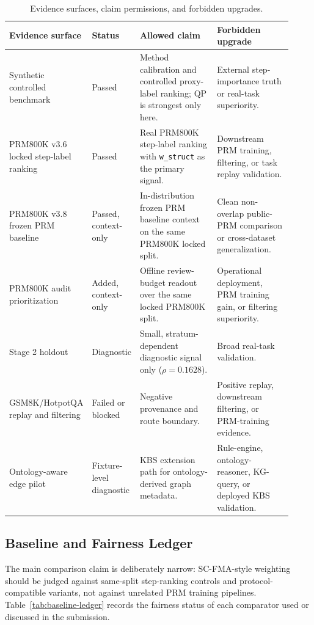 \documentclass[a4paper,fleqn]{cas-sc}
\begin{document}
\begin{table}[t]
\caption{Evidence surfaces, claim permissions, and forbidden upgrades.}
\label{tab:data-boundary}
\centering
\scriptsize
\begin{tabular}{p{0.20\linewidth}p{0.16\linewidth}p{0.29\linewidth}p{0.27\linewidth}}
\toprule
\textbf{Evidence surface} & \textbf{Status} & \textbf{Allowed claim} & \textbf{Forbidden upgrade} \\
\midrule
Synthetic controlled benchmark & Passed & Method calibration and controlled proxy-label ranking; QP is strongest only here. & External step-importance truth or real-task superiority. \\
PRM800K v3.6 locked step-label ranking & Passed & Real PRM800K step-label ranking with \texttt{w\_struct} as the primary signal. & Downstream PRM training, filtering, or task replay validation. \\
PRM800K v3.8 frozen PRM baseline & Passed, context-only & In-distribution frozen PRM baseline context on the same PRM800K locked split. & Clean non-overlap public-PRM comparison or cross-dataset generalization. \\
PRM800K audit prioritization & Added, context-only & Offline review-budget readout over the same locked PRM800K split. & Operational deployment, PRM training gain, or filtering superiority. \\
Stage 2 holdout & Diagnostic & Small, stratum-dependent diagnostic signal only ($\rho=0.1628$). & Broad real-task validation. \\
GSM8K/HotpotQA replay and filtering & Failed or blocked & Negative provenance and route boundary. & Positive replay, downstream filtering, or PRM-training evidence. \\
Ontology-aware edge pilot & Fixture-level diagnostic & KBS extension path for ontology-derived graph metadata. & Rule-engine, ontology-reasoner, KG-query, or deployed KBS validation. \\
\bottomrule
\end{tabular}
\end{table}

\subsection{Baseline and Fairness Ledger}

The main comparison claim is deliberately narrow: SC-FMA-style weighting should be judged against same-split step-ranking controls and protocol-compatible variants, not against unrelated PRM training pipelines. Table~\ref{tab:baseline-ledger} records the fairness status of each comparator used or discussed in the submission.
\end{document}
